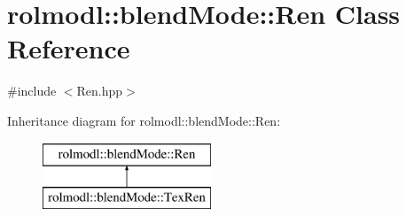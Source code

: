 \hypertarget{classrolmodl_1_1blend_mode_1_1_ren}{}\section{rolmodl\+::blend\+Mode\+::Ren Class Reference}
\label{classrolmodl_1_1blend_mode_1_1_ren}


{\ttfamily \#include $<$Ren.\+hpp$>$}

Inheritance diagram for rolmodl\+::blend\+Mode\+::Ren\+:\begin{figure}[H]
\begin{center}
\leavevmode
\includegraphics[height=2.000000cm]{classrolmodl_1_1blend_mode_1_1_ren}
\end{center}
\end{figure}
